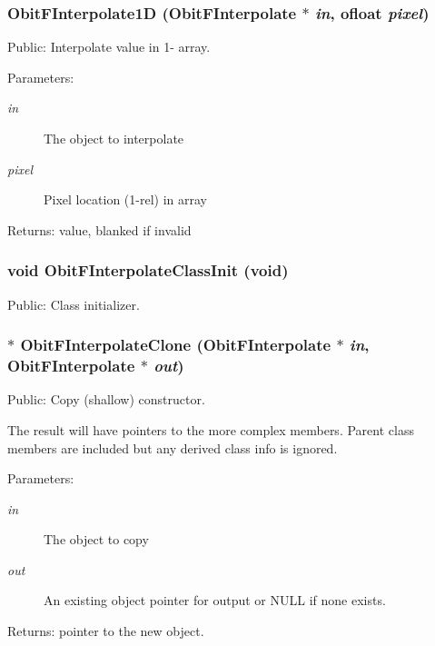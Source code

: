 \subsubsection{ Obit\-FInterpolate1D ({\bf Obit\-FInterpolate} $\ast$ {\em in}, {\bf ofloat} {\em pixel})}\label{ObitFInterpolate_8h_a11}


Public: Interpolate value in 1- array. 

\begin{Desc}
\item[Parameters:]
\begin{description}
\item[{\em in}]The object to interpolate \item[{\em pixel}]Pixel location (1-rel) in array \end{description}
\end{Desc}
\begin{Desc}
\item[Returns:]value, blanked if invalid \end{Desc}
\subsubsection{\setlength{\rightskip}{0pt plus 5cm}void Obit\-FInterpolate\-Class\-Init (void)}\label{ObitFInterpolate_8h_a3}


Public: Class initializer. 

\subsubsection{$\ast$ Obit\-FInterpolate\-Clone ({\bf Obit\-FInterpolate} $\ast$ {\em in}, {\bf Obit\-FInterpolate} $\ast$ {\em out})}\label{ObitFInterpolate_8h_a8}


Public: Copy (shallow) constructor. 

The result will have pointers to the more complex members. Parent class members are included but any derived class info is ignored. \begin{Desc}
\item[Parameters:]
\begin{description}
\item[{\em in}]The object to copy \item[{\em out}]An existing object pointer for output or NULL if none exists. \end{description}
\end{Desc}
\begin{Desc}
\item[Returns:]pointer to the new object. \end{Desc}
